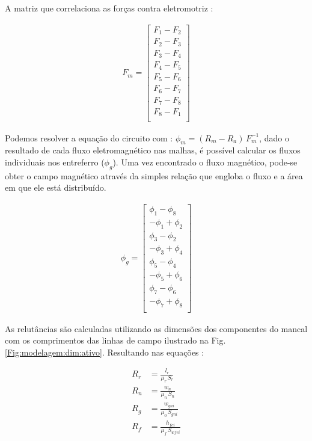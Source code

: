 A matriz que correlaciona as forças contra eletromotriz :

\begin{align}
F_m = 
\begin{bmatrix}
	F_1 - F_2 \\
	F_2 - F_3 \\
	F_3 - F_4 \\
	F_4 - F_5 \\
	F_5 - F_6 \\
	F_6 - F_7 \\
	F_7 - F_8 \\
	F_8 - F_1 \\
\end{bmatrix}
\end{align}

Podemos resolver a equação do circuito com : $ \phi_m = (R_m - R_a) \, F_m^{-1}$, dado o resultado de cada fluxo eletromagnético nas malhas, é possível calcular os fluxos individuais nos entreferro ($\phi_g$). Uma vez encontrado o fluxo magnético, pode-se obter o campo magnético através da simples relação que engloba o fluxo e a área em que ele está distribuído.

\begin{align}
	\phi_g = 
	\begin{bmatrix}
		 \phi_1 - \phi_8 \\
		-\phi_1 + \phi_2 \\ 
		\phi_3 - \phi_2 \\ 
		-\phi_3 + \phi_4 \\ 
		\phi_5 - \phi_4 \\ 
		-\phi_5 + \phi_6 \\ 
		\phi_7- \phi_6  \\
		-\phi_7+ \phi_8 \\
	\end{bmatrix}
	\label{eq:ativo:fluxo:entreferro}
\end{align}

As relutâncias são calculadas utilizando as dimensões dos componentes do mancal com os comprimentos das linhas de campo ilustrado na Fig. \ref{Fig:modelagem:dim:ativo}. Resultando nas equações :

\begin{align}
R_{r}  &= \frac{l_r}{\mu_r \, S_r}			\\
R_{n} &= \frac{w_{n}}{\mu_{n}\, S_{n}}  \\     
R_{g} &= \frac{w_{gni}}{\mu_{0}\, S_{gni}}   \\    
R_{f} &= \frac{h_{fei}}{\mu_{f} \, S_{wfei}}    
\end{align}



